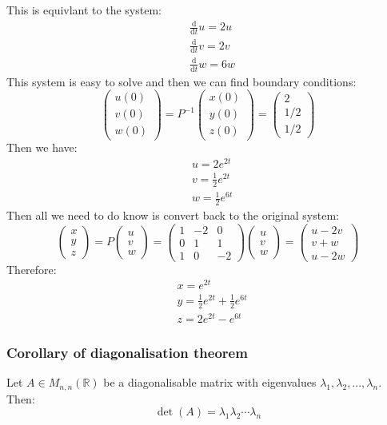 \documentclass[12pt]{article}
\newcommand{\df}[2]{\frac{\text{d}#1}{\text{d}#2}}
\begin{document}
This is equivlant to the system:
\begin{align*}
    &\df{}{t}u=2u \\
    &\df{}{t}v= 2v \\
    &\df{}{t}w=6w
\end{align*}
This system is easy to solve and then we can find boundary conditions:
\[\begin{pmatrix}
    u(0) \\
    v(0) \\
    w(0)
\end{pmatrix}=P^{-1}\begin{pmatrix}
    x(0) \\
    y(0) \\
    z(0)
\end{pmatrix}=\begin{pmatrix}
    2 \\ 1/2 \\ 1/2
\end{pmatrix}\]
Then we have:
\begin{align*}
    &u=2e^{2t} \\
    &v=\frac{1}{2}e^{2t} \\
    &w=\frac{1}{2}e^{6t}
\end{align*}
Then all we need to do know is convert back to the original system:
\[\begin{pmatrix}
    x \\ y \\ z
\end{pmatrix}=P\begin{pmatrix}
    u \\ v \\ w
\end{pmatrix}=\begin{pmatrix}
    1 & -2 & 0 \\
    0 & 1 & 1 \\
    1 & 0 & -2
\end{pmatrix}\begin{pmatrix}
    u \\ v \\ w
\end{pmatrix}=\begin{pmatrix}
    u-2v \\
    v+w \\
    u-2w
\end{pmatrix}\]
Therefore:
\begin{align*}
    &x=e^{2t}\\
    &y=\frac{1}{2}e^{2t}+\frac{1}{2}e^{6t} \\
    &z=2e^{2t}-e^{6t}
\end{align*}
\subsubsection*{Corollary of diagonalisation theorem}
Let \(A\in M_{n,n}(\mathbb{R})\) be a diagonalisable matrix with eigenvalues \(\lambda_1,\lambda_2,...,\lambda_n\). Then:
\[\det(A)=\lambda_1\lambda_2\cdots\lambda_n\]
\end{document}
